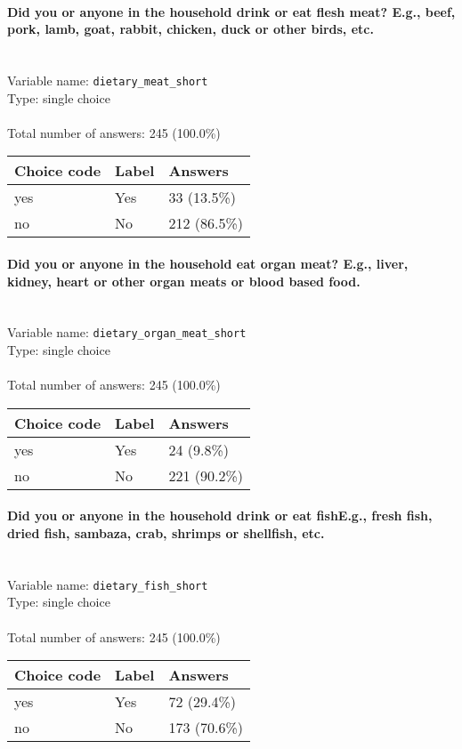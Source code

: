 \documentclass[11.5pt, a4paper]{scrartcl}
\begin{document}
\paragraph{Did you or anyone in the household drink or eat flesh meat? E.g., beef, pork, lamb, goat, rabbit, chicken, duck or other birds, etc.}
\  \\Variable name: \texttt{dietary\_meat\_short}\\
Type: single choice\\
\\Total number of answers: 245 (100.0\%)
\\[0.2em] \begin{tabular}{p{4cm}|p{8cm}|p{3cm}}
Choice code & Label & Answers \\
\hline
yes & Yes& \cellcolor{color0}33 (13.5\%)\\
\cellcolor{mygray} no & \cellcolor{mygray}No & \cellcolor{color4}212 (86.5\%)\\
\end{tabular}
\paragraph{Did you or anyone in the household eat organ meat? E.g., liver, kidney, heart or other organ meats or blood based food.}
\  \\Variable name: \texttt{dietary\_organ\_meat\_short}\\
Type: single choice\\
\\Total number of answers: 245 (100.0\%)
\\[0.2em] \begin{tabular}{p{4cm}|p{8cm}|p{3cm}}
Choice code & Label & Answers \\
\hline
yes & Yes& \cellcolor{color0}24 (9.8\%)\\
\cellcolor{mygray} no & \cellcolor{mygray}No & \cellcolor{color4}221 (90.2\%)\\
\end{tabular}
\paragraph{Did you or anyone in the household drink or eat fishE.g., fresh fish, dried fish, sambaza, crab, shrimps or shellfish, etc.}
\  \\Variable name: \texttt{dietary\_fish\_short}\\
Type: single choice\\
\\Total number of answers: 245 (100.0\%)
\\[0.2em] \begin{tabular}{p{4cm}|p{8cm}|p{3cm}}
Choice code & Label & Answers \\
\hline
yes & Yes& \cellcolor{color1}72 (29.4\%)\\
\cellcolor{mygray} no & \cellcolor{mygray}No & \cellcolor{color3}173 (70.6\%)\\
\end{tabular}
\end{document}
